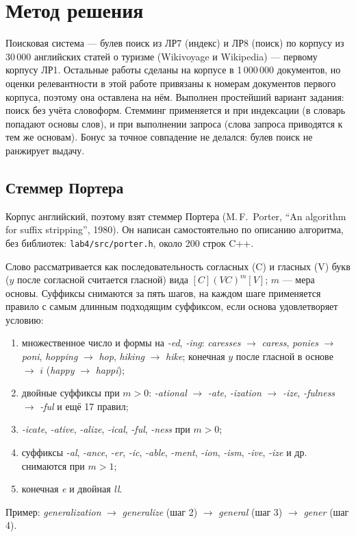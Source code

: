 \pagebreak
\section{Метод решения}
Поисковая система --- булев поиск из ЛР7 (индекс) и ЛР8 (поиск) по корпусу из 30\,000 английских статей о туризме (Wikivoyage и Wikipedia) --- первому корпусу ЛР1. Остальные работы сделаны на корпусе в 1\,000\,000 документов, но оценки релевантности в этой работе привязаны к номерам документов первого корпуса, поэтому она оставлена на нём. Выполнен простейший вариант задания: поиск без учёта словоформ. Стемминг применяется и при индексации (в словарь попадают основы слов), и при выполнении запроса (слова запроса приводятся к тем же основам). Бонус за точное совпадение не делался: булев поиск не ранжирует выдачу.

\subsection{Стеммер Портера}
Корпус английский, поэтому взят стеммер Портера (M.\,F.~Porter, \enquote{An algorithm for suffix stripping}, 1980). Он написан самостоятельно по описанию алгоритма, без библиотек: \texttt{lab4/src/porter.h}, около 200 строк C++.

Слово рассматривается как последовательность согласных (C) и гласных (V) букв ($y$ после согласной считается гласной) вида $[C](VC)^m[V]$; $m$ --- мера основы. Суффиксы снимаются за пять шагов, на каждом шаге применяется правило с самым длинным подходящим суффиксом, если основа удовлетворяет условию:
\begin{enumerate}
    \item множественное число и формы на \emph{-ed}, \emph{-ing}: \emph{caresses} $\to$ \emph{caress}, \emph{ponies} $\to$ \emph{poni}, \emph{hopping} $\to$ \emph{hop}, \emph{hiking} $\to$ \emph{hike}; конечная $y$ после гласной в основе $\to$ $i$ (\emph{happy} $\to$ \emph{happi});
    \item двойные суффиксы при $m > 0$: \emph{-ational} $\to$ \emph{-ate}, \emph{-ization} $\to$ \emph{-ize}, \emph{-fulness} $\to$ \emph{-ful} и ещё 17 правил;
    \item \emph{-icate}, \emph{-ative}, \emph{-alize}, \emph{-ical}, \emph{-ful}, \emph{-ness} при $m > 0$;
    \item суффиксы \emph{-al}, \emph{-ance}, \emph{-er}, \emph{-ic}, \emph{-able}, \emph{-ment}, \emph{-ion}, \emph{-ism}, \emph{-ive}, \emph{-ize} и др. снимаются при $m > 1$;
    \item конечная \emph{e} и двойная \emph{ll}.
\end{enumerate}
Пример: \emph{generalization} $\to$ \emph{generalize} (шаг 2) $\to$ \emph{general} (шаг 3) $\to$ \emph{gener} (шаг 4).


